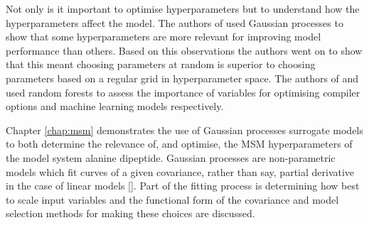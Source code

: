 Not only is it important to optimise hyperparameters but to understand how the hyperparameters affect the model. The authors of \cite{bergstrajamesbergstraRandomSearchHyperParameter2012} used Gaussian processes to show that some hyperparameters are more relevant for improving model performance than others. Based on this observations the authors went on to show that this meant choosing parameters at random is superior to choosing parameters based on a regular grid in hyperparameter space. The authors of  \cite{gramacyVariableSelectionSensitivity2013} and \cite{pmlr-v32-hutter14} used  random forests to assess the importance of variables for optimising compiler options and machine learning models respectively. 

Chapter \ref{chap:msm} demonstrates the use of Gaussian processes surrogate models to both determine the relevance of, and optimise, the MSM hyperparameters of the model system alanine dipeptide. Gaussian processes are non-parametric models which fit curves of a given covariance, rather than say, partial derivative in the case of linear models []. Part of the fitting process is determining how best to scale input variables and the functional form of the covariance and model selection methods for making these choices are discussed. 

